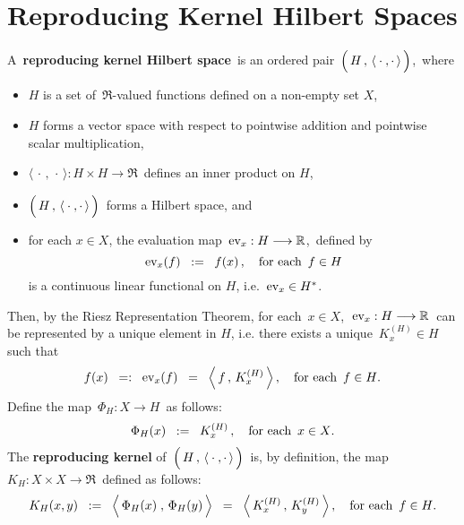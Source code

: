 
\section{Reproducing Kernel Hilbert Spaces}
\setcounter{theorem}{0}

\renewcommand{\theenumi}{\roman{enumi}}
\renewcommand{\labelenumi}{\textnormal{(\theenumi)}$\;\;$}


\begin{definition}
\mbox{}
\vskip 0.1cm
\noindent
A \,\textbf{reproducing kernel Hilbert space}\, is an ordered pair
\,$\left(\,H\,,\,\langle\,\overset{{\color{white}1}}{\cdot}\,,\cdot\,\rangle\,\right)$,\,
where

\begin{itemize}
\item
	$H$ is a set of \,$\Re$-valued functions defined on a non-empty set $X$,
\item
	$H$ forms a vector space with respect to pointwise addition and pointwise scalar multiplication,
\item
	$\langle\,\cdot\,,\,\cdot\,\rangle : H \times H \longrightarrow \Re$\, defines an inner product on $H$,
\item
	$\left(\,H\,,\,\langle\,\overset{{\color{white}1}}{\cdot}\,,\cdot\,\rangle\,\right)$\,
	forms a Hilbert space, and
\item
	for each $x \in X$, the evaluation map \,$\textnormal{ev}_{x} : H \longrightarrow \mathbb{R}$,\, defined by
	\begin{equation*}
	\textnormal{ev}_{x}(f) \;\; := \;\; f(x)\,,
	\quad
	\textnormal{for each \,$f \in H$}
	\end{equation*}
	is a continuous linear functional on $H$, i.e. \,$\textnormal{ev}_{x} \in H^{*}$.
\end{itemize}
Then, by the Riesz Representation Theorem, for each \,$x \in X$,\,
\,$\textnormal{ev}_{x} : H \longrightarrow \mathbb{R}$\,
can be represented by a unique element in $H$,
i.e. there exists a unique \,$K^{(H)}_{x} \in H$\, such that
\begin{equation*}
f(x)
\;\; =: \;\;
	\textnormal{ev}_{x}(f)
\;\; = \;\;
	\left\langle\,f\,,\,K^{(H)}_{x}\,\right\rangle,
\quad
\textnormal{for each \,$f \in H$}.
\end{equation*}
Define the map
\,$\Phi_{H} : X \longrightarrow H$\,
as follows:
\begin{equation*}
\Phi_{H}(x) \;\; := \;\; K^{(H)}_{x}\,,
\quad
\textnormal{for each \,$x\in X$}.
\end{equation*}
The \textbf{reproducing kernel} of
\,$\left(\,H\,,\,\langle\,\overset{{\color{white}1}}{\cdot}\,,\cdot\,\rangle\,\right)$\,
is, by definition, the map
\,$K_{H} : X \times X \longrightarrow \Re$\, defined as follows:
\begin{equation*}
K_{H}(x,y)
\;\; := \;\;
	\left\langle\,\overset{{\color{white}.}}{\Phi_{H}(x)}\;,\,\Phi_{H}(y)\,\right\rangle
\;\; = \;\;
	\left\langle\,K^{(H)}_{x}\,,\,K^{(H)}_{y}\,\right\rangle,
\quad
\textnormal{for each \,$f \in H$}.
\end{equation*}
\end{definition}

